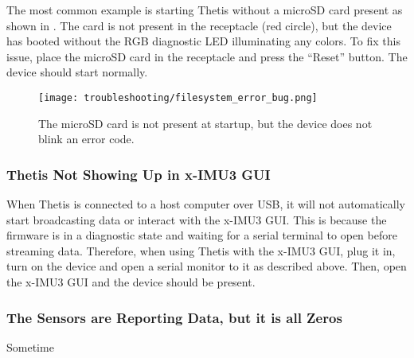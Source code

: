 The most common example is starting Thetis without a microSD card present as shown in . 
The card is not present in the receptacle (red circle), but the device has booted without the RGB diagnostic LED illuminating any colors.
To fix this issue, place the microSD card in the receptacle and press the ``Reset'' button.
The device should start normally.

\begin{figure}[H]
    \centering
    \texttt{[image: troubleshooting/filesystem\_error\_bug.png]}
    \caption{The microSD card is not present at startup, but the device does not blink an error code.}
    \label{fig:filesystem_error_bug}
\end{figure}

\subsubsection{Thetis Not Showing Up in x-IMU3 GUI}
When Thetis is connected to a host computer over USB, it will not automatically start broadcasting data or interact with the x-IMU3 GUI.
This is because the firmware is in a diagnostic state and waiting for a serial terminal to open before streaming data.
Therefore, when using Thetis with the x-IMU3 GUI, plug it in, turn on the device and open a serial monitor to it as described above.
Then, open the x-IMU3 GUI and the device should be present.

\subsubsection{The Sensors are Reporting Data, but it is all Zeros}
Sometime